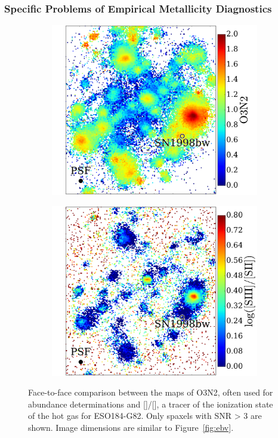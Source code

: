 \documentclass[traditabstract]{aa}
\newcommand{\sii}{[\ion{S}{ii}]}
\newcommand{\siii}{[\ion{S}{iii}]}
\begin{document}
\subsubsection{Specific Problems of Empirical Metallicity Diagnostics}

\begin{figure}
\begin{subfigure}{.24\textwidth}
  \includegraphics[width=0.999\linewidth]{Figs/MUSE_SN1998bw_O3N2.pdf}
\end{subfigure}
\begin{subfigure}{.249\textwidth}
  \includegraphics[width=0.999\linewidth]{Figs/MUSE_SN1998bw_S3S2.pdf}
\end{subfigure}
\caption{Face-to-face comparison between the maps of O3N2, often used for abundance determinations and \siii/\sii, a tracer of the ionization state of the hot gas for ESO184-G82. Only spaxels with SNR > 3 are shown. Image dimensions are similar to Figure~\ref{fig:ebv}.}
\label{fig:s3s2}
\end{figure}
\end{document}
